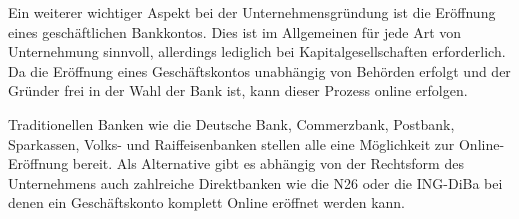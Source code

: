 Ein weiterer wichtiger Aspekt bei der Unternehmensgründung ist die Eröffnung eines geschäftlichen Bankkontos.
Dies ist im Allgemeinen für jede Art von Unternehmung sinnvoll, allerdings lediglich bei Kapitalgesellschaften erforderlich. 
Da die Eröffnung eines Geschäftskontos unabhängig von Behörden erfolgt und der Gründer frei in der Wahl der Bank ist, kann dieser Prozess online erfolgen.

Traditionellen Banken wie die Deutsche Bank, Commerzbank, Postbank, Sparkassen, Volks- und Raiffeisenbanken stellen alle eine Möglichkeit zur Online-Eröffnung bereit. 
 Als Alternative gibt es abhängig von der Rechtsform des Unternehmens auch zahlreiche Direktbanken wie die N26 oder die ING-DiBa bei denen ein Geschäftskonto komplett Online eröffnet werden kann.
